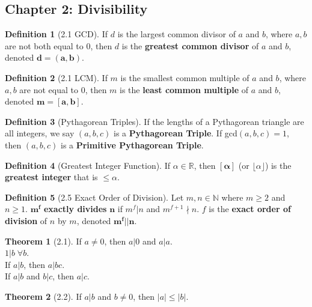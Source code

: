 \documentclass{article}
\newcommand{\R}{\ensuremath{\mathbb{R}}}
\newcommand{\N}{\ensuremath{\mathbb{N}}}
\newcommand{\floor}[1]{\lfloor #1 \rfloor}
\theoremstyle{definition}
\newtheorem*{defn}{Definition}
\newtheorem*{thm}{Theorem}
\theoremstyle{remark}
\begin{document}
    \subsection*{Chapter 2: Divisibility}{
        \begin{defn}[2.1 GCD]
            If $d$ is the largest common divisor of $a$ and $b$, where $a,b$ are not both equal to $0$, then $d$ is the \textbf{greatest common divisor} of $a$ and $b$, denoted $\mathbf{d=(a,b)}$.
        \end{defn}
        
        \begin{defn}[2.1 LCM]
            If $m$ is the smallest common multiple of $a$ and $b$, where $a,b$ are not equal to $0$, then $m$ is the \textbf{least common multiple} of $a$ and $b$, denoted $\mathbf{m=[a,b]}$.
        \end{defn}
        
        \begin{defn}[Pythagorean Triples]
            If the lengths of a Pythagorean triangle are all integers, we say $(a,b,c)$ is a \textbf{Pythagorean Triple}. If gcd$(a,b,c)=1$, then $(a,b,c)$ is a \textbf{Primitive Pythagorean Triple}.
        \end{defn}
        
        \begin{defn}[Greatest Integer Function]
            If $\alpha \in \R$, then $\mathbf{[\alpha]}$ (or $\floor{\alpha}$) is the \textbf{greatest integer} that is $\leq \alpha$.
        \end{defn}
        
        \begin{defn}[2.5 Exact Order of Division]
            Let $m, n \in \N$ where $m\geq 2$ and $n\geq 1$. $\mathbf{m^f}$ \textbf{exactly divides} $\mathbf{n}$ if $m^f|n$ and $m^{f+1}\nmid n$. $f$ is the \textbf{exact order of division} of $n$ by $m$, denoted $\mathbf{m^f||n}$.
        \end{defn}
        
        \begin{thm}[2.1]
            If $a\neq 0$, then $a|0$ and $a|a$.\\
            $1|b \; \forall b$.\\
            If $a|b$, then $a|bc$.\\
            If $a|b$ and $b|c$, then $a|c$.
        \end{thm}
        
        \begin{thm}[2.2]
            If $a|b$ and $b\neq 0$, then $|a|\leq |b|$.
        \end{thm}
        
}
\end{document}
